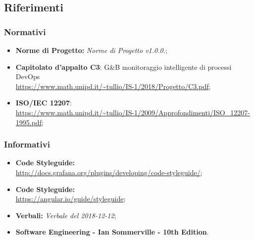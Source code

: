 \subsection{Riferimenti}
\subsubsection{Normativi}
\begin{itemize}
	\item \textbf{Norme di Progetto:} \emph{Norme di Progetto v1.0.0.};
	\item \textbf{Capitolato d'appalto C3}: G\&B monitoraggio intelligente di processi DevOps \\
	\url{https://www.math.unipd.it/~tullio/IS-1/2018/Progetto/C3.pdf};
	\item \textbf{ISO/IEC 12207}:\\ \url{https://www.math.unipd.it/~tullio/IS-1/2009/Approfondimenti/ISO_12207-1995.pdf};
\end{itemize}
\subsubsection{Informativi}
\begin{itemize}
	\item \textbf{ Code Styleguide:} \\
	\url{http://docs.grafana.org/plugins/developing/code-styleguide/};
	\item \textbf{ Code Styleguide:} \\
	\url{https://angular.io/guide/styleguide};
	\item \textbf{Verbali:} \emph{Verbale del 2018-12-12};
	\item \textbf{Software Engineering - Ian Sommerville - 10th Edition}.
\end{itemize}
\pagebreak